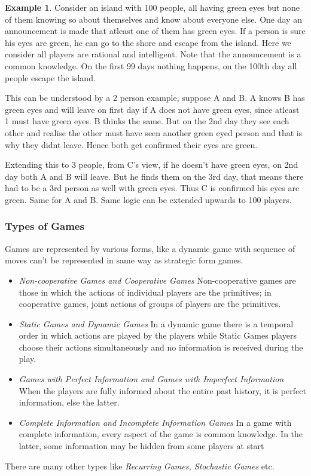 \documentclass{article}
\theoremstyle{definition}
\newtheorem{example}{Example}[section]
\begin{document}
\begin{example} 
Consider an island with 100 people, all having green eyes but none of them knowing so about themselves and know about everyone else. One day an announcement is made that atleast one of them has green eyes. If a person is sure his eyes are green, he can go to the shore and escape from the island. Here we consider all players are rational and intelligent. Note that the announcement is a common knowledge. On the first 99 days nothing happens, on the 100th day all people escape the island.

This can be understood by a 2 person example, suppose A and B. A knows B has green eyes and will leave on first day if A does not have green eyes, since atleast 1 must have green eyes. B thinks the same. But on the 2nd day they see each other and realise the other must have seen another green eyed person and that is why they didnt leave. Hence both get confirmed their eyes are green.

Extending this to 3 people, from C's view, if he doesn't have green eyes, on 2nd day both A and B will leave. But he finds them on the 3rd day, that means there had to be a 3rd person as well with green eyes. Thus C is confirmed his eyes are green. Same for A and B. Same logic can be extended upwards to 100 players.
\end{example}
\subsubsection{Types of Games}
Games are represented by various forms, like a dynamic game with sequence of moves can't be represented in same way as strategic form games.
\begin{itemize}
	\item \textit{Non-cooperative Games and Cooperative Games} Non-cooperative games are those in which the actions of individual players are the primitives; in cooperative games, joint actions of groups of players are the primitives.
	\item \textit{Static Games and Dynamic Games} In a dynamic game there is a temporal order in which actions are played by the players while Static Games players choose their actions simultaneously and no information is received during the play.
	\item \textit{Games with Perfect Information and Games with Imperfect Information} When the players are fully informed about the entire past history, it is perfect information, else the latter.
	\item \textit{Complete Information and Incomplete Information Games} In a game with complete information, every aspect of the game is common knowledge. In the latter, some information may be hidden from some players at start
\end{itemize}
There are many other types like \textit{Recurring Games, Stochastic Games} etc.
\end{document}
